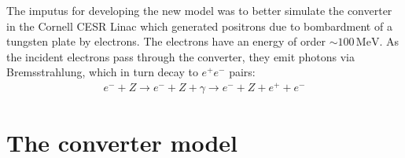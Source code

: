 \documentclass[12pt]{article}
\newcommand{\MeV}{\, \mathrm{MeV}}
\begin{document}
The imputus for developing the new model was to better simulate the converter in the Cornell CESR
Linac which generated positrons due to bombardment of a tungsten plate by electrons. The electrons
have an energy of order $\sim 100 \MeV$.  As the incident electrons pass through the
converter, they emit photons via Bremsstrahlung, which in turn decay to $e^+ e^-$ pairs:
\begin{align}
  e^- + Z \rightarrow e^- + Z + \gamma \rightarrow e^- + Z + e^+ + e^-
\end{align}

\newpage
\section{The converter model}
\end{document}
